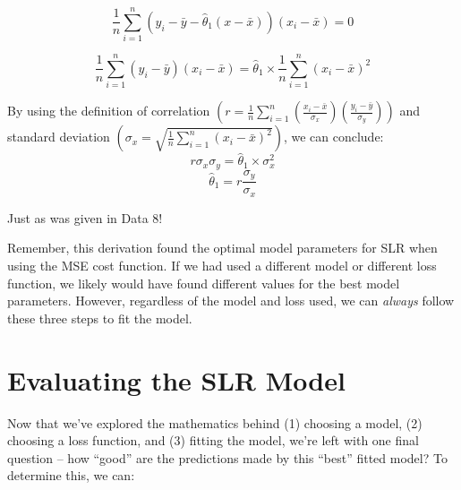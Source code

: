 \documentclass[
  letterpaper,
  DIV=11,
  numbers=noendperiod]{scrreprt}
\begin{document}
\[\frac{1}{n} \sum_{i=1}^n (y_i - \bar{y} - \hat{\theta}_1(x - \bar{x}))(x_i - \bar{x}) = 0 \]

\[\frac{1}{n} \sum_{i=1}^n (y_i - \bar{y})(x_i - \bar{x}) = \hat{\theta}_1 \times \frac{1}{n} \sum_{i=1}^n (x_i - \bar{x})^2
\]

By using the definition of correlation
\(\left(r = \frac{1}{n} \sum_{i=1}^n (\frac{x_i-\bar{x}}{\sigma_x})(\frac{y_i-\bar{y}}{\sigma_y}) \right)\)
and standard deviation
\(\left(\sigma_x = \sqrt{\frac{1}{n} \sum_{i=1}^n (x_i - \bar{x})^2} \right)\),
we can conclude:
\[r \sigma_x \sigma_y = \hat{\theta}_1 \times \sigma_x^2\]
\[\hat{\theta}_1 = r \frac{\sigma_y}{\sigma_x}\]

Just as was given in Data 8!

Remember, this derivation found the optimal model parameters for SLR
when using the MSE cost function. If we had used a different model or
different loss function, we likely would have found different values for
the best model parameters. However, regardless of the model and loss
used, we can \emph{always} follow these three steps to fit the model.

\section{Evaluating the SLR Model}\label{evaluating-the-slr-model}

Now that we've explored the mathematics behind (1) choosing a model, (2)
choosing a loss function, and (3) fitting the model, we're left with one
final question -- how ``good'' are the predictions made by this ``best''
fitted model? To determine this, we can:
\end{document}
